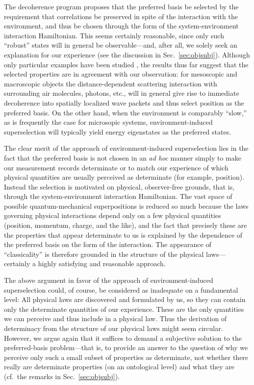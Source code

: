 \documentclass[rmp,aps,amsmath,amsfonts,noshowkeys,noshowpacs,12pt]{revtex4}
\newcommand{\cf}{cf.\ }
\begin{document}
The decoherence program proposes that the preferred basis be selected
by the requirement that correlations be preserved in spite of the
interaction with the environment, and thus be chosen through the form
of the system-environment interaction Hamiltonian. This seems
certainly reasonable, since only such ``robust'' states will in
general be observable---and, after all, we solely seek an explanation
for our experience (see the discussion in Sec.~\ref{sec:objsubj}).
Although only particular examples have been studied \citep[for a
survey and references, see, for
example,][]{Joos:2003:jh,Blanchard:2000:fq,Zurek:2002:ii}, the results
thus far suggest that the selected properties are in agreement with
our observation: for mesoscopic and macroscopic objects the
distance-dependent scattering interaction with surrounding air
molecules, photons, etc., will in general give rise to immediate
decoherence into spatially localized wave packets and thus select
position as the preferred basis. On the other hand, when the
environment is comparably ``slow,'' as is frequently the case for
microsopic systems, environment-induced superselection will typically
yield energy eigenstates as the preferred states.

The clear merit of the approach of environment-induced superselection
lies in the fact that the preferred basis is not chosen in an \emph{ad
  hoc} manner simply to make our measurement records determinate or to
match our experience of which physical quantities are usually
perceived as determinate (for example, position). Instead the
selection is motivated on physical, observer-free grounds, that is,
through the system-environment interaction Hamiltonian. The vast
space of possible quantum-mechanical superpositions is reduced so much
because the laws governing physical interactions depend only on a few
physical quantities (position, momentum, charge, and the like), and
the fact that precisely these are the properties that appear
determinate to us is explained by the dependence of the preferred
basis on the form of the interaction. The appearance of
``classicality'' is therefore grounded in the structure of the
physical laws---certainly a highly satisfying and reasonable approach.

The above argument in favor of the approach of environment-induced
superselection could, of course, be considered as inadequate on a
fundamental level: All physical laws are discovered and formulated by
us, so they can contain only the determinate quantities of our
experience. These are the only quantities we can perceive and thus
include in a physical law. Thus the derivation of determinacy from the
structure of our physical laws might seem circular.  However, we argue
again that it suffices to demand a subjective solution to the
preferred-basis problem---that is, to provide an answer to the
question of why we perceive only such a small subset of properties
as determinate, not whether there really are determinate
properties (on an ontological level) and what they are (\cf the
remarks in Sec.~\ref{sec:objsubj}).
\end{document}
